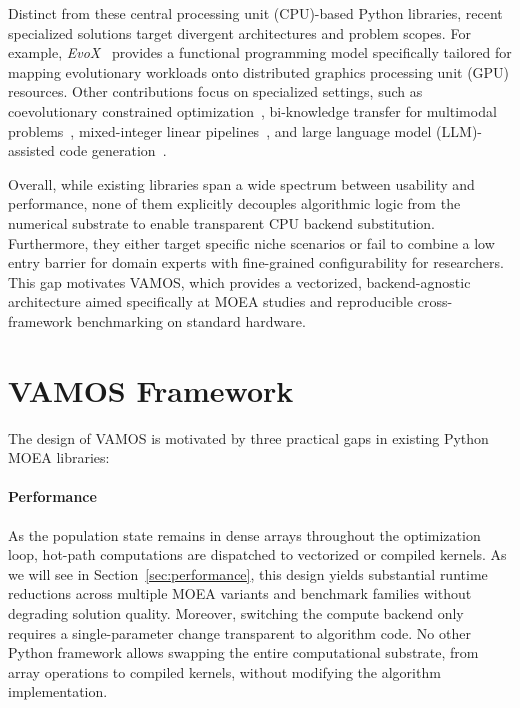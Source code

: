 \documentclass[final,5p,times,twocolumn]{elsarticle}
\newcommand{\VAMOS}{VAMOS}
\begin{document}
Distinct from these central processing unit (CPU)-based Python libraries, recent specialized solutions target divergent architectures and problem scopes. For example, \textit{EvoX}~\cite{HCL+25} provides a functional programming model specifically tailored for mapping evolutionary workloads onto distributed graphics processing unit (GPU) resources. Other contributions focus on specialized settings, such as coevolutionary constrained optimization~\cite{TZX+21}, bi-knowledge transfer for multimodal problems~\cite{ZNL+26}, mixed-integer linear pipelines~\cite{YXC26}, and large language model (LLM)-assisted code generation~\cite{MGG+26}. 

Overall, while existing libraries span a wide spectrum between usability and performance, none of them explicitly decouples algorithmic logic from the numerical substrate to enable transparent CPU backend substitution. Furthermore, they either target specific niche scenarios or fail to combine a low entry barrier for domain experts with fine-grained configurability for researchers. This gap motivates \VAMOS{}, which provides a vectorized, backend-agnostic architecture aimed specifically at MOEA studies and reproducible cross-framework benchmarking on standard hardware.


\section{VAMOS Framework} \label{sec:framework}

The design of VAMOS is motivated by three practical gaps in existing Python MOEA libraries: 

\paragraph{Performance} As the population state remains in dense arrays throughout the optimization loop, hot-path computations are dispatched to vectorized or compiled kernels. As we will see in Section~\ref{sec:performance}, this design yields substantial runtime reductions across multiple MOEA variants and benchmark families without degrading solution quality. Moreover, switching the compute backend only requires a single-parameter change transparent to algorithm code. No other Python framework allows swapping the entire computational substrate, from array operations to compiled kernels, without modifying the algorithm implementation.
\end{document}
